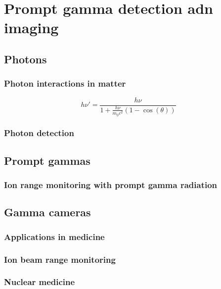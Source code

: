 \chapter{Prompt gamma detection adn imaging}\label{chap::2}

\vfill

\minitoc

\newpage

\glsresetall

\section{Photons}

\subsection{Photon interactions in matter}

\begin{equation}
h\nu' = \frac{h\nu}{1+\frac{h\nu}{m_{0}c^2}(1-\cos(\theta))}
\label{chap2::eq::Compton}
\end{equation} 

\subsection{Photon detection}


\section{Prompt gammas}

\subsection{Ion range monitoring with prompt gamma radiation}

\section{Gamma cameras}

\subsection{Applications in medicine}

\subsection{Ion beam range monitoring}

\subsection{Nuclear medicine}

